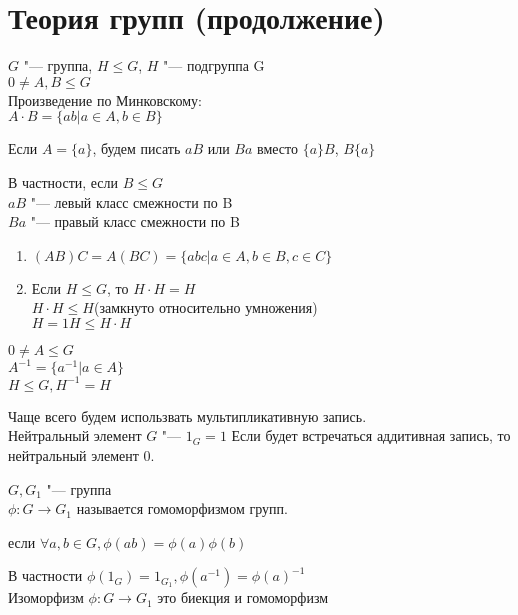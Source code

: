 ﻿\chapter{Теория групп (продолжение)}
\begin{Rem}
$G$ "--- группа, $H \le G$, $H$ "--- подгруппа G\\

$0 \ne A, B \le G$\\
Произведение по Минковскому:\\
$A \cdot B = \{ab| a \in A, b \in B\}$

Если $A = \{a\}$, будем писать $aB$ или $Ba$ вместо $\{a\}B$, $B\{a\}$

В частности, если $B \le G$\\
    $aB$ "--- левый класс смежности по B\\
    $Ba$ "--- правый класс смежности по B\\
\end{Rem}

\begin{conseq}
\begin{enumerate}
\item$(AB)C = A(BC) = \{abc|a \in A, b \in B, c \in C\}$\\
\item
Если $H \le G$, то $H \cdot H = H$\\
   $H \cdot H \le H$(замкнуто относительно умножения)\\
   $H = 1 H \le H \cdot H$\\
\end{enumerate}
\end{conseq}
\begin{Def}
$0 \ne A \le G$\\
$A^{-1} = \{a^{-1}|a \in A\}$\\
$H \le G, H^{-1} = H$\\
\end{Def}
\begin{Rem}
Чаще всего будем использвать мультипликативную запись.\\
Нейтральный элемент $G$ "--- $1_{G} = 1$
Если будет  встречаться аддитивная запись, то нейтральный элемент $0$.
\end{Rem}

\begin{Def}
$G, G_1$ "--- группа\\
$\phi \colon G \to G_1$ называется гомоморфизмом групп. 

если $\forall a, b \in G, \phi(ab) = \phi(a) \phi(b)$

В частности $\phi(1_G) = 1_{G_1}, \phi(a^{-1}) = \phi(a)^{-1}$\\

Изоморфизм $\phi \colon G \to G_1$ это биекция и гомоморфизм \\
\end{Def}
    

